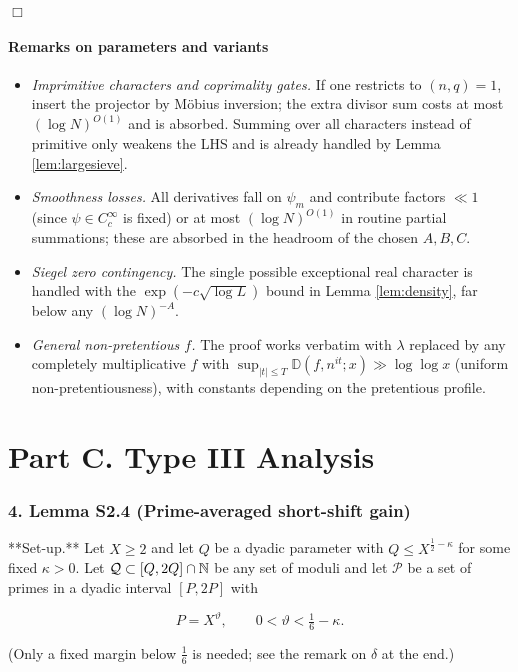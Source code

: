 \documentclass[11pt]{article}
\theoremstyle{definition}
\theoremstyle{remark}
\begin{document}
\hfill$\Box$

\subsection*{Remarks on parameters and variants}
\begin{itemize}[leftmargin=1.7em]
\item \emph{Imprimitive characters and coprimality gates.} If one restricts to $(n,q)=1$, insert the projector by Möbius inversion; the extra divisor sum costs at most $(\log N)^{O(1)}$ and is absorbed. Summing over all characters instead of primitive only weakens the LHS and is already handled by Lemma \ref{lem:largesieve}.
\item \emph{Smoothness losses.} All derivatives fall on $\psi_m$ and contribute factors $\ll 1$ (since $\psi\in C_c^\infty$ is fixed) or at most $(\log N)^{O(1)}$ in routine partial summations; these are absorbed in the headroom of the chosen $A,B,C$.
\item \emph{Siegel zero contingency.} The single possible exceptional real character is handled with the $\exp(-c\sqrt{\log L})$ bound in Lemma \ref{lem:density}, far below any $(\log N)^{-A}$.
\item \emph{General non-pretentious $f$.} The proof works verbatim with $\lambda$ replaced by any completely multiplicative $f$ with $\sup_{|t|\le T}\mathbb D(f,n^{it};x)\gg \log\log x$ (uniform non-pretentiousness), with constants depending on the pretentious profile.
\end{itemize}

\part*{Part C. Type III Analysis}

\section*{4. Lemma S2.4 (Prime-averaged short-shift gain)}

**Set-up.** Let $X\ge 2$ and let $Q$ be a dyadic parameter with $Q\le X^{\tfrac12-\kappa}$ for some fixed $\kappa>0$. Let $\mathcal Q\subset[Q,2Q]\cap\Bbb N$ be any set of moduli and let $\mathcal P$ be a set of primes in a dyadic interval $[P,2P]$ with

$$
P=X^{\vartheta},\qquad 0<\vartheta<\tfrac16-\kappa.
$$

(Only a fixed margin below $\tfrac16$ is needed; see the remark on $\delta$ at the end.)
\end{document}
